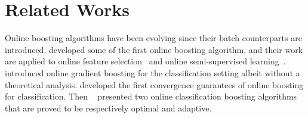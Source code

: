 

\section{Related Works}
\label{sec:sgb_background}


Online boosting algorithms have been evolving since their batch counterparts are introduced. \cite{Oza01onlinebagging} developed some of the first online boosting algorithm, and their work are applied to online feature selection~\citep{grabner:2006} and online semi-supervised learning~\citep{grabner:2008}. 
\cite{leistner:2009} introduced online gradient boosting for the classification setting albeit without a theoretical analysis. \cite{lu:2012} developed the first convergence guarantees of online boosting for classification. Then ~\cite{beygelzimer2015optimal} presented two online classification boosting algorithms that are proved to be respectively optimal and adaptive. 

